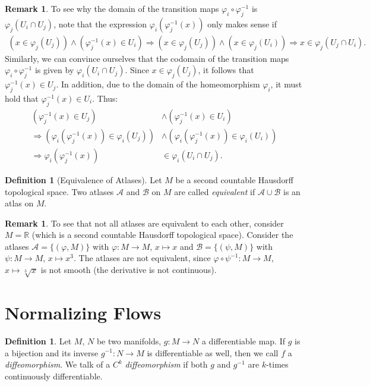 \documentclass[12pt, a4paper]{article}
\numberwithin{equation}{section}
\theoremstyle{definition}
\theoremstyle{definition}
\newtheorem{defn}[thm]{Definition} %
\newtheorem{remark}[thm]{Remark} %
\begin{document}
	\begin{remark}
		To see why the domain of the transition maps $\varphi_i \circ \varphi_j^{-1}$ is $\varphi_j\left(U_i \cap U_j\right)$, note that the expression $\varphi_i\left(\varphi_j^{-1}\left(x\right)\right)$ only makes sense if 
		\begin{align*}
			\left(x\in \varphi_j(U_j)\right) \wedge  \left(\varphi_j^{-1}\left(x\right)\in U_i\right) \Rightarrow \left(x\in \varphi_j(U_j)\right) \wedge \left(x\in \varphi_j\left(U_i\right)\right) \Rightarrow x\in \varphi_j(U_j \cap U_i). 
		\end{align*}
		Similarly, we can convince ourselves that the codomain of the transition maps $\varphi_i\circ\varphi_j^{-1}$ is given by $\varphi_i(U_i\cap U_j)$. Since $x\in \varphi_j(U_j)$, it follows that $\varphi_j^{-1}(x)\in U_j$. In addition, due to the domain of the homeomorphism $\varphi_i$, it must hold that $\varphi_j^{-1}(x) \in U_i$. Thus: 
		\begin{align*}
			\left(\varphi_j^{-1}(x)\in U_j\right) &\wedge \left(\varphi_j^{-1}(x) \in U_i\right) 
			\\
			\Rightarrow 			\left(\varphi_i(\varphi_j^{-1}(x))\in \varphi_i(U_j)\right) &\wedge \left(\varphi_i(\varphi_j^{-1}(x))\in \varphi_i(U_i)\right) 
			\\ 
			\Rightarrow \varphi_i\left(\varphi_j^{-1}(x)\right) &\in \varphi_i\left(U_i\cap U_j\right). 
		\end{align*}
	\end{remark}
	
	\begin{defn}[Equivalence of Atlases]
		Let $M$ be a second countable Hausdorff topological space. Two atlases $\mathcal A$ and $\mathcal B$ on $M$ are called \textit{equivalent} if $\mathcal A\cup \mathcal B$ is an atlas on $M$.  
	\end{defn}

	\begin{remark}
		To see that not all atlases are equivalent to each other, consider $M = \mathbb R$ (which is a second countable Hausdorff topological space). Consider the atlases $\mathcal A = \{ (\varphi, M) \}$ with $\varphi: M\rightarrow M$, $x\mapsto x$ and $\mathcal B = \{(\psi, M)\}$ with $\psi: M\rightarrow M$, $x\mapsto x^3$. The atlases are not equivalent, since $\varphi\circ \psi^{-1}: M \rightarrow M$, $x\mapsto \sqrt[3]{x}$ is not smooth (the derivative is not continuous). 
	\end{remark}
	
	\newpage 
	\section{Normalizing Flows}
	\begin{defn}\label{defn-diffeomorphism}
		Let $M$, $N$ be two manifolds, $g: M\rightarrow N$ a differentiable map. If $g$ is a bijection and its inverse $g^{-1}: N\rightarrow M$ is differentiable as well, then we call $f$ a \textit{diffeomorphism}. We talk of a $C^k$ \textit{diffeomorphism} if both $g$ and $g^{-1}$ are $k$-times continuously differentiable. 
	\end{defn}
	
\end{document}
